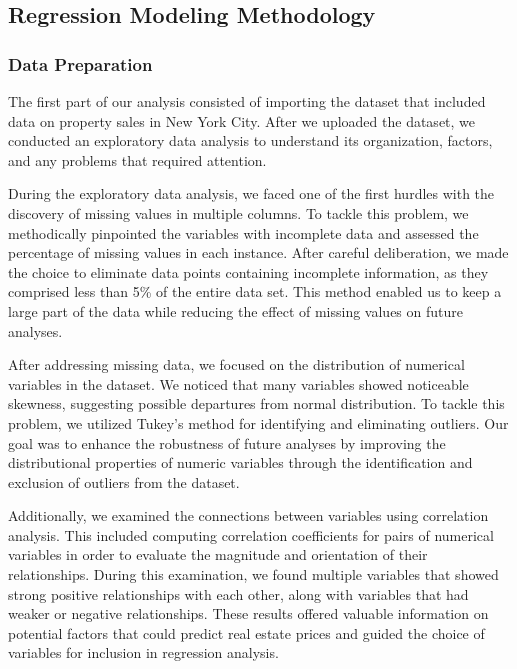 \documentclass[
]{article}
\begin{document}
\hypertarget{regression-modeling-methodology}{%
\subsection{Regression Modeling
Methodology}\label{regression-modeling-methodology}}

\hypertarget{data-preparation}{%
\subsubsection{Data Preparation}\label{data-preparation}}

The first part of our analysis consisted of importing the dataset that
included data on property sales in New York City. After we uploaded the
dataset, we conducted an exploratory data analysis to understand its
organization, factors, and any problems that required attention.

During the exploratory data analysis, we faced one of the first hurdles
with the discovery of missing values in multiple columns. To tackle this
problem, we methodically pinpointed the variables with incomplete data
and assessed the percentage of missing values in each instance. After
careful deliberation, we made the choice to eliminate data points
containing incomplete information, as they comprised less than 5\% of
the entire data set. This method enabled us to keep a large part of the
data while reducing the effect of missing values on future analyses.

After addressing missing data, we focused on the distribution of
numerical variables in the dataset. We noticed that many variables
showed noticeable skewness, suggesting possible departures from normal
distribution. To tackle this problem, we utilized Tukey's method for
identifying and eliminating outliers. Our goal was to enhance the
robustness of future analyses by improving the distributional properties
of numeric variables through the identification and exclusion of
outliers from the dataset.

Additionally, we examined the connections between variables using
correlation analysis. This included computing correlation coefficients
for pairs of numerical variables in order to evaluate the magnitude and
orientation of their relationships. During this examination, we found
multiple variables that showed strong positive relationships with each
other, along with variables that had weaker or negative relationships.
These results offered valuable information on potential factors that
could predict real estate prices and guided the choice of variables for
inclusion in regression analysis.
\end{document}
